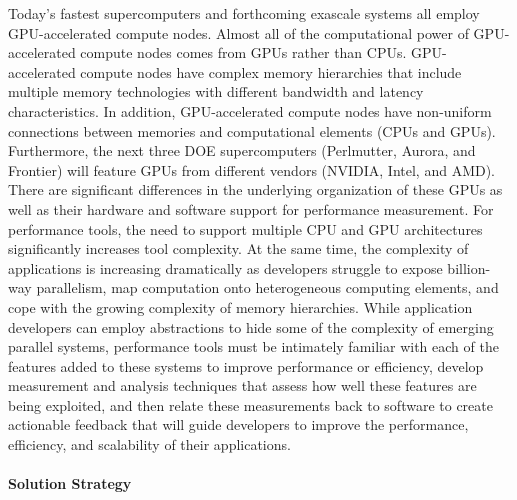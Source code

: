 Today's fastest supercomputers and forthcoming exascale systems all
employ GPU-accelerated compute nodes. Almost all of the 
computational power of GPU-accelerated compute nodes comes from GPUs rather than CPUs.
GPU-accelerated compute nodes have complex memory hierarchies that include 
multiple memory technologies with different bandwidth and latency characteristics. In addition, 
GPU-accelerated compute nodes have non-uniform connections between memories and computational elements (CPUs and GPUs). 
Furthermore, the next three DOE supercomputers (Perlmutter, Aurora, and Frontier) will feature GPUs from different vendors (NVIDIA, Intel, and AMD). 
There are significant differences in the underlying organization of these GPUs as well as their hardware and software support for performance measurement. For
performance tools, the need to support multiple CPU and GPU architectures significantly increases tool complexity.  At the same time, the
complexity of applications is increasing dramatically as developers
struggle to expose billion-way parallelism, map computation onto
heterogeneous computing elements, and cope with the growing complexity
of memory hierarchies. While application developers can employ
abstractions to hide some of the complexity of emerging parallel
systems, performance tools must be intimately familiar with each of
the features added to these systems to improve performance or
efficiency, develop measurement and analysis techniques that assess
how well these features are being exploited, and then relate these
measurements back to software to create actionable feedback that will
guide developers to improve the performance, efficiency, and
scalability of their applications.

\paragraph{Solution Strategy}

